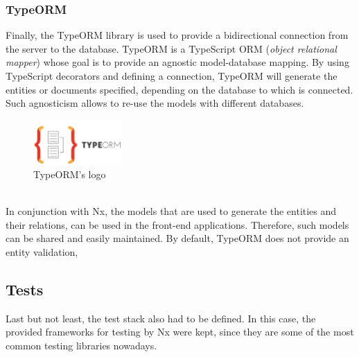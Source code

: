 \documentclass[a4paper, 12pt, oneside]{book}
\begin{document}
\subsubsection{TypeORM}
Finally, the TypeORM library is used to provide a bidirectional connection from the server to the database. TypeORM is a TypeScript ORM (\emph{object relational mapper}) whose goal is to provide an agnostic model-database mapping. By using TypeScript decorators and defining a connection, TypeORM will generate the entities or documents specified, depending on the database to which is connected. Such agnosticism allows to re-use the models with different databases.
\\
\begin{figure}[h!]
	\centering
	\includegraphics[width=0.3\textwidth]{assets/typeorm-logo.png}
	\caption{TypeORM's logo}
\end{figure}
\\
In conjunction with Nx, the models that are used to generate the entities and their relations, can be used in the front-end applications. Therefore, such models can be shared and easily maintained. By default, TypeORM does not provide an entity validation,
\subsection{Tests}
Last but not least, the test stack also had to be defined. In this case, the provided frameworks for testing by Nx were kept, since they are some of the most common testing libraries nowadays.
\end{document}
